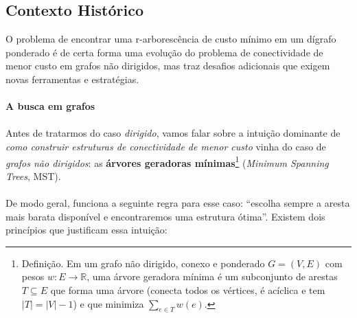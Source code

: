 \documentclass[12pt,a4paper]{article}
\begin{document}
\subsection{Contexto Histórico}
O problema de encontrar uma r-arborescência de custo mínimo em um dígrafo ponderado é de certa forma uma evolução do problema de conectividade de menor custo em grafos não dirigidos, mas traz desafios adicionais que exigem novas ferramentas e estratégias.

\paragraph{A busca em grafos}

\paragraph{}
Antes de tratarmos do caso \emph{dirigido}, vamos falar sobre a intuição dominante de \emph{como construir estruturas de conectividade de menor custo} vinha do caso de \emph{grafos não dirigidos}: as \textbf{árvores geradoras mínimas}\footnote{Definição. Em um grafo não dirigido, conexo e ponderado \(G=(V,E)\) com pesos \(w:E\to\mathbb{R}\), uma árvore geradora mínima é um subconjunto de arestas \(T\subseteq E\) que forma uma árvore (conecta todos os vértices, é acíclica e tem \(|T|=|V|-1\)) e que minimiza \(\sum_{e\in T} w(e)\).} (\emph{Minimum Spanning Trees}, MST). 

\paragraph{}
De modo geral, funciona a seguinte regra para esse caso: “escolha sempre a aresta mais barata disponível e encontraremos uma estrutura ótima”. Existem dois princípios que justificam essa intuição:
\end{document}
